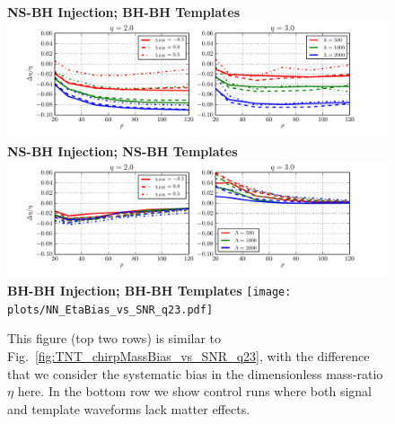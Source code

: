 \documentclass[aps,prd,amsmath,floats,floatfix, twocolumn,
superscriptaddress,nofootinbib,showpacs]{revtex4-1}
\begin{document}
\begin{figure}[!t]
\centering    
\textbf{NS-BH Injection; BH-BH Templates}
\includegraphics[width=1.7\columnwidth]{plots/TN_EtaBias_vs_SNR_q23.pdf}\\ 
\textbf{NS-BH Injection; NS-BH Templates}
\includegraphics[width=1.7\columnwidth]{plots/TT_EtaBias_vs_SNR_q23.pdf}\\%
\textbf{BH-BH Injection; BH-BH Templates}
\texttt{[image: plots/NN\_EtaBias\_vs\_SNR\_q23.pdf]} 
\caption{This figure (top two rows) is similar to Fig.~\ref{fig:TNT_chirpMassBias_vs_SNR_q23},
with the difference that we consider the systematic bias in the dimensionless
mass-ratio $\eta$ here. In the bottom row we show control runs where both
signal and template waveforms lack matter effects.}
\label{fig:TNT_EtaBias_vs_SNR_q23}
\end{figure}
% 
\end{document}
